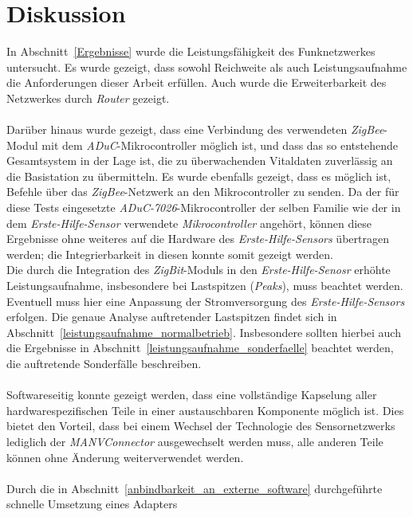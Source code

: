 
\chapter{Diskussion}\label{Diskussion}
In Abschnitt~\ref{Ergebnisse} wurde die Leistungsfähigkeit des Funknetzwerkes untersucht.
Es wurde gezeigt, dass sowohl Reichweite als auch Leistungsaufnahme die Anforderungen
dieser Arbeit erfüllen. Auch wurde die Erweiterbarkeit des Netzwerkes durch \emph{Router} gezeigt.\\
\\
Darüber hinaus wurde gezeigt, dass eine Verbindung des verwendeten \emph{ZigBee}-Modul
mit dem \emph{ADuC}-Mikrocontroller möglich ist, und dass das so entstehende Gesamtsystem
in der Lage ist, die zu überwachenden Vitaldaten zuverlässig an die Basistation zu übermitteln.
Es wurde ebenfalls gezeigt, dass es möglich ist, Befehle über das \emph{ZigBee}-Netzwerk
an den Mikrocontroller zu senden. Da der für diese Tests eingesetzte \emph{ADuC-7026}-Mikrocontroller
der selben Familie wie der in dem \emph{Erste-Hilfe-Sensor} verwendete \emph{Mikrocontroller} angehört,
können diese Ergebnisse ohne weiteres auf die Hardware des \emph{Erste-Hilfe-Sensors} übertragen werden; 
die Integrierbarkeit in diesen konnte somit gezeigt werden.\\
Die durch die Integration des \emph{ZigBit}-Moduls in den \emph{Erste-Hilfe-Senosr} erhöhte Leistungsaufnahme, 
insbesondere bei Lastspitzen (\emph{Peaks}), muss beachtet werden. Eventuell muss hier eine Anpassung der 
Stromversorgung des \emph{Erste-Hilfe-Sensors} erfolgen.
Die genaue Analyse auftretender Lastspitzen findet sich in Abschnitt~\ref{leistungsaufnahme_normalbetrieb}.
Insbesondere sollten hierbei auch die Ergebnisse in Abschnitt~\ref{leistungsaufnahme_sonderfaelle} beachtet 
werden, die auftretende Sonderfälle beschreiben.\\
\\
Softwareseitig konnte gezeigt werden, dass eine vollständige Kapselung aller hardwarespezifischen Teile
in einer austauschbaren Komponente möglich ist. Dies bietet den Vorteil, dass bei einem Wechsel 
der Technologie des Sensornetzwerks lediglich der \emph{MANVConnector} ausgewechselt werden muss,
alle anderen Teile können ohne Änderung weiterverwendet werden.\\
\\
Durch die in Abschnitt~\ref{anbindbarkeit_an_externe_software} durchgeführte schnelle Umsetzung eines Adapters 
